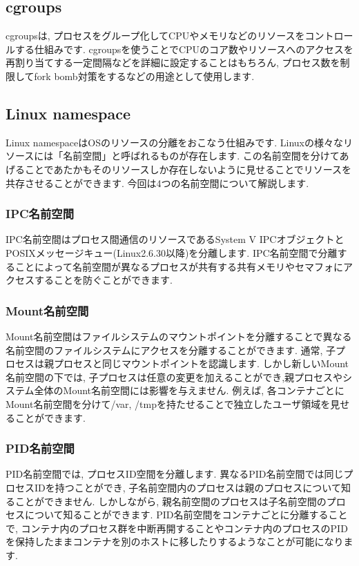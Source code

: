 \subsection{cgroups}
cgroupsは, プロセスをグループ化してCPUやメモリなどのリソースをコントロールする仕組みです. cgroupsを使うことでCPUのコア数やリソースへのアクセスを再割り当てする一定間隔などを詳細に設定することはもちろん, プロセス数を制限してfork bomb対策をするなどの用途として使用します.
\subsection{Linux namespace}
Linux namespaceはOSのリソースの分離をおこなう仕組みです. Linuxの様々なリソースには「名前空間」と呼ばれるものが存在します. この名前空間を分けてあげることであたかもそのリソースしか存在しないように見せることでリソースを共存させることができます. 今回は4つの名前空間について解説します.
\subsubsection{IPC名前空間}
IPC名前空間はプロセス間通信のリソースであるSystem V IPCオブジェクトとPOSIXメッセージキュー(Linux2.6.30以降)を分離します. IPC名前空間で分離することによって名前空間が異なるプロセスが共有する共有メモリやセマフォにアクセスすることを防ぐことができます.
\subsubsection{Mount名前空間}
Mount名前空間はファイルシステムのマウントポイントを分離することで異なる名前空間のファイルシステムにアクセスを分離することができます. 通常, 子プロセスは親プロセスと同じマウントポイントを認識します. しかし新しいMount名前空間の下では, 子プロセスは任意の変更を加えることができ,親プロセスやシステム全体のMount名前空間には影響を与えません. 例えば, 各コンテナごとにMount名前空間を分けて/var, /tmpを持たせることで独立したユーザ領域を見せることができます.
\subsubsection{PID名前空間}
PID名前空間では, プロセスID空間を分離します. 異なるPID名前空間では同じプロセスIDを持つことができ, 子名前空間内のプロセスは親のプロセスについて知ることができません. しかしながら, 親名前空間のプロセスは子名前空間のプロセスについて知ることができます. PID名前空間をコンテナごとに分離することで, コンテナ内のプロセス群を中断再開することやコンテナ内のプロセスのPIDを保持したままコンテナを別のホストに移したりするようなことが可能になります.
